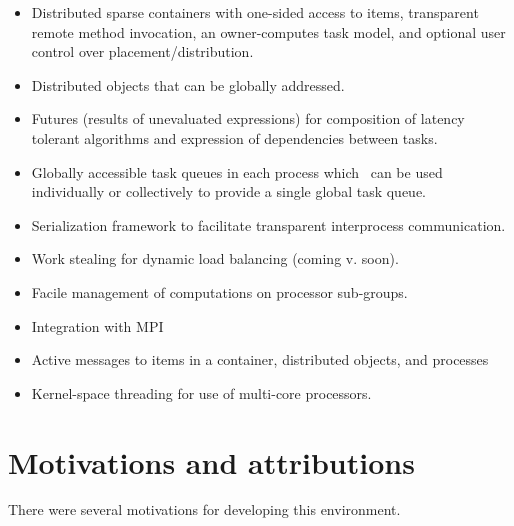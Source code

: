 \documentclass[letterpaper]{article}
\newcommand\liststyleLiii{%
\renewcommand\labelitemi{${\bullet}$}
\renewcommand\labelitemii{${\circ}$}
\renewcommand\labelitemiii{${\blacksquare}$}
\renewcommand\labelitemiv{${\bullet}$}
}
\begin{document}
\liststyleLiii
\begin{itemize}
\item Distributed sparse containers with one-sided access to items, transparent remote method invocation, an
owner-computes task model, and optional user control over placement/distribution.
\item Distributed objects that can be globally addressed.
\item Futures (results of unevaluated expressions) for composition of latency tolerant algorithms and expression of
dependencies between tasks.
\item Globally accessible task queues in each process which \ can be used individually or collectively to provide a
single global task queue.
\item Serialization framework to facilitate transparent interprocess communication.
\item Work stealing for dynamic load balancing (coming v. soon).
\item Facile management of computations on processor sub-groups.
\item Integration with MPI
\item Active messages to items in a container, distributed objects, and processes
\item Kernel-space threading for use of multi-core processors.
\end{itemize}
\section{Motivations and attributions}
There were several motivations for developing this environment.
\end{document}
